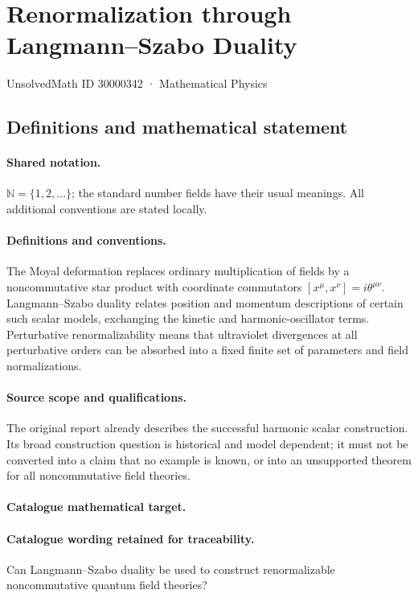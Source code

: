 \documentclass[11pt]{article}
\begin{document}
\setcounter{section}{30000341}
\section{Renormalization through Langmann–Szabo Duality}\label{30000342}
{\small UnsolvedMath ID 30000342 · Mathematical Physics}
\subsection{Definitions and mathematical statement}

\paragraph{Shared notation.}$\mathbb N=\{1,2,\ldots\}$; the standard number fields have their usual meanings. All additional conventions are stated locally.


\paragraph{Definitions and conventions.} The Moyal deformation replaces ordinary multiplication of fields by a noncommutative star product with coordinate commutators $[x^\mu,x^\nu]=i\theta^{\mu\nu}$. Langmann--Szabo duality relates position and momentum descriptions of certain such scalar models, exchanging the kinetic and harmonic-oscillator terms. Perturbative renormalizability means that ultraviolet divergences at all perturbative orders can be absorbed into a fixed finite set of parameters and field normalizations.

\paragraph{Source scope and qualifications.} The original report already describes the successful harmonic scalar construction. Its broad construction question is historical and model dependent; it must not be converted into a claim that no example is known, or into an unsupported theorem for all noncommutative field theories.

\paragraph{Catalogue mathematical target.}
\paragraph{Catalogue wording retained for traceability.}
Can Langmann–Szabo duality be used to construct renormalizable noncommutative quantum field theories?
\end{document}
